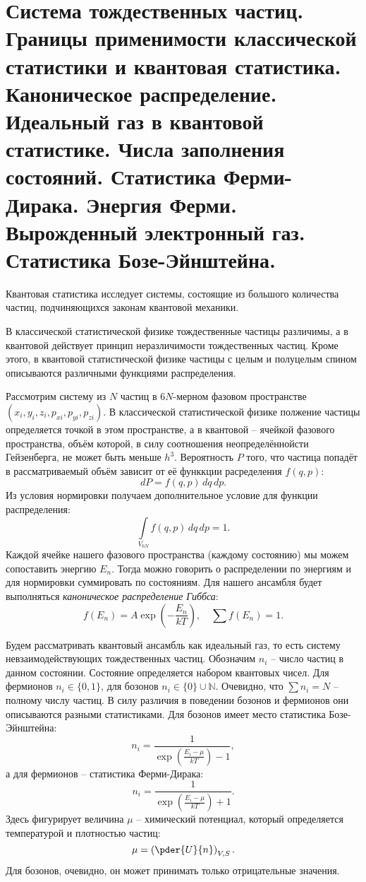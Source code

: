 \chapter{Система тождественных частиц. Границы применимости классической 
статистики и квантовая статистика. Каноническое распределение. 
Идеальный газ в квантовой статистике. Числа заполнения состояний. 
Статистика Ферми-Дирака. Энергия Ферми. Вырожденный электронный газ. 
Статистика Бозе-Эйнштейна.}

Квантовая статистика исследует системы, состоящие из большого количества частиц,
подчиняющихся законам квантовой механики.

В классической статистической физике тождественные частицы различимы, а
в квантовой действует принцип неразличимости тождественных частиц. Кроме этого,
в квантовой статистической физике частицы с целым и полуцелым спином описываются
различными функциями распределения.

Рассмотрим систему из \( N \) частиц в \( 6N \)-мерном фазовом пространстве
\( (x_i, y_i, z_i, p_{xi}, p_{yi}, p_{zi}) \). В классической статистической
физике полжение частицы определяется точкой в этом пространстве, а в квантовой
-- ячейкой фазового пространства, объём которой, в силу соотношения
неопределённойсти Гейзенберга, не может быть меньше \( h^3 \). Вероятность
\( P \) того, что частица попадёт в рассматриваемый объём зависит от её функкции
расределения \( f(q,p) \):
\[
    dP = f(q,p)\,dq\,dp.
\]
Из условия нормировки получаем дополнительное условие для функции распределения:
\[
    \int\limits_{V_{6N}} f(q,p)\,dq\,dp = 1.
\]
Каждой ячейке нашего фазового пространства (каждому состоянию) мы можем
сопоставить энергию \( E_n \). Тогда можно говорить о распределении по энергиям
и для нормировки суммировать по состояниям. Для нашего ансамбля будет
выполняться \emph{каноническое распределение Гиббса}:
\[
    f(E_n) = A\exp(-\frac{E_n}{kT}),\quad\sum f(E_n) = 1.
\]

Будем рассматривать квантовый ансамбль как идеальный газ, то есть систему
невзаимодействующих тождественных частиц. Обозначим \( n_i \) -- число
частиц в данном состоянии. Состояние определяется набором квантовых чисел.
Для фермионов \( n_i\in\{0,1\} \), для бозонов \( n_i\in\{0\}\cup\mathbb{N} \).
Очевидно, что \( \sum n_i = N \) -- полному числу частиц.
В силу различия в поведении бозонов и фермионов они описываются разными
статистиками. Для бозонов имеет место статистика Бозе-Эйнштейна:
\[
    n_i = \frac{1}{\exp(\frac{E_i-\mu}{kT}) - 1},
\]
а для фермионов -- статистика Ферми-Дирака:
\[
    n_i = \frac{1}{\exp(\frac{E_i-\mu}{kT}) + 1}.
\]
Здесь фигурирует величина \( \mu \) -- химический потенциал, который
определяется температурой и плотностью частиц:
\[
    \mu = \left(\pder{U}{n}\right)_{V,S}.
\]
Для бозонов, очевидно, он может принимать только отрицательные значения.

